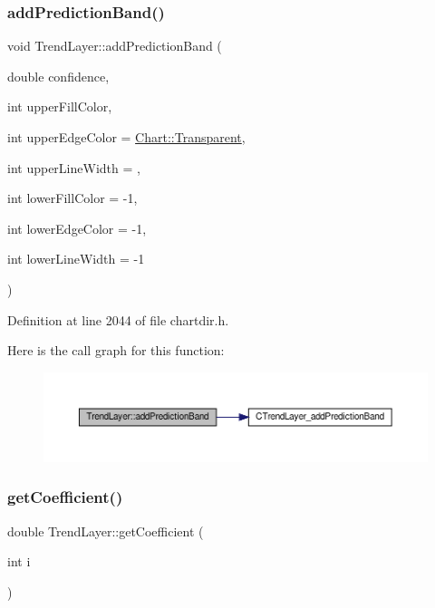 \subsubsection{\texorpdfstring{add\+Prediction\+Band()}{addPredictionBand()}}
{\footnotesize\ttfamily void Trend\+Layer\+::add\+Prediction\+Band (\begin{DoxyParamCaption}\item[{double}]{confidence,  }\item[{int}]{upper\+Fill\+Color,  }\item[{int}]{upper\+Edge\+Color = {\ttfamily \hyperlink{namespace_chart_abee0d882fdc9ad0b001245ad9fc64011afc6811800a9e2582dac0157b6279f836}{Chart\+::\+Transparent}},  }\item[{int}]{upper\+Line\+Width = {},  }\item[{int}]{lower\+Fill\+Color = {\ttfamily -\/1},  }\item[{int}]{lower\+Edge\+Color = {\ttfamily -\/1},  }\item[{int}]{lower\+Line\+Width = {\ttfamily -\/1} }\end{DoxyParamCaption})\hspace{0.3cm}{\ttfamily [inline]}}



Definition at line 2044 of file chartdir.\+h.

Here is the call graph for this function\+:
\nopagebreak
\begin{figure}[H]
\begin{center}
\leavevmode
\includegraphics[width=350pt]{class_trend_layer_a9d6da57188ba79e09d52cd8064a9a6fb_cgraph}
\end{center}
\end{figure}
\mbox{\label{class_trend_layer_a7ff42064c53aefd537e89fdc66e9bf79}} 
\subsubsection{\texorpdfstring{get\+Coefficient()}{getCoefficient()}}
{\footnotesize\ttfamily double Trend\+Layer\+::get\+Coefficient (\begin{DoxyParamCaption}\item[{int}]{i }\end{DoxyParamCaption})\hspace{0.3cm}{\ttfamily [inline]}}




